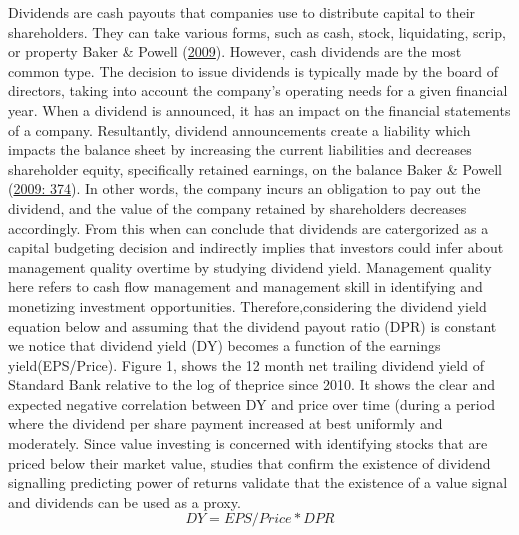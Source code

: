 \documentclass[11pt,preprint, authoryear]{elsarticle}
\numberwithin{equation}{section}
\numberwithin{figure}{section}
\numberwithin{table}{section}
\begin{document}
Dividends are cash payouts that companies use to distribute capital to
their shareholders. They can take various forms, such as cash, stock,
liquidating, scrip, or property Baker \& Powell
(\protect\hyperlink{ref-baker2009understanding}{2009}). However, cash
dividends are the most common type. The decision to issue dividends is
typically made by the board of directors, taking into account the
company's operating needs for a given financial year. When a dividend is
announced, it has an impact on the financial statements of a company.
Resultantly, dividend announcements create a liability which impacts the
balance sheet by increasing the current liabilities and decreases
shareholder equity, specifically retained earnings, on the balance Baker
\& Powell (\protect\hyperlink{ref-baker2009understanding}{2009: 374}).
In other words, the company incurs an obligation to pay out the
dividend, and the value of the company retained by shareholders
decreases accordingly. From this when can conclude that dividends are
catergorized as a capital budgeting decision and indirectly implies that
investors could infer about management quality overtime by studying
dividend yield. Management quality here refers to cash flow management
and management skill in identifying and monetizing investment
opportunities. Therefore,considering the dividend yield equation below
and assuming that the dividend payout ratio (DPR) is constant we notice
that dividend yield (DY) becomes a function of the earnings
yield(EPS/Price). Figure 1, shows the 12 month net trailing dividend
yield of Standard Bank relative to the log of theprice since 2010. It
shows the clear and expected negative correlation between DY and price
over time (during a period where the dividend per share payment
increased at best uniformly and moderately. Since value investing is
concerned with identifying stocks that are priced below their market
value, studies that confirm the existence of dividend signalling
predicting power of returns validate that the existence of a value
signal and dividends can be used as a proxy. \[
DY=EPS/Price*DPR
\]
\end{document}
